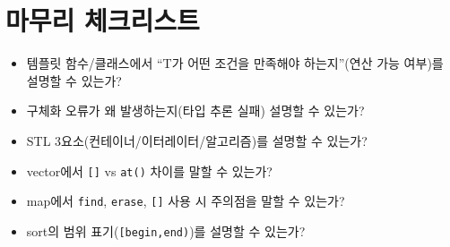 \documentclass[11pt,a4paper]{article}
\begin{document}
\section*{마무리 체크리스트}
\begin{GoalBox}
\begin{itemize}[leftmargin=18pt]
  \item 템플릿 함수/클래스에서 ``T가 어떤 조건을 만족해야 하는지''(연산 가능 여부)를 설명할 수 있는가?
  \item 구체화 오류가 왜 발생하는지(타입 추론 실패) 설명할 수 있는가?
  \item STL 3요소(컨테이너/이터레이터/알고리즘)를 설명할 수 있는가?
  \item vector에서 \texttt{[]} vs \texttt{at()} 차이를 말할 수 있는가?
  \item map에서 \texttt{find}, \texttt{erase}, \texttt{[]} 사용 시 주의점을 말할 수 있는가?
  \item sort의 범위 표기(\texttt{[begin,end)})를 설명할 수 있는가?
\end{itemize}
\end{GoalBox}
\end{document}
